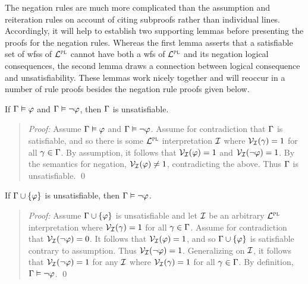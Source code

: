 The negation rules are much more complicated than the assumption and reiteration rules on account of citing subproofs rather than individual lines.
Accordingly, it will help to establish two supporting lemmas before presenting the proofs for the negation rules.
Whereas the first lemma asserts that a satisfiable set of wfss of $\mathcal{L}^{\textsc{pl}}$ cannot have both a wfs of $\mathcal{L}^{\textsc{pl}}$ and its negation logical consequences, the second lemma draws a connection between logical consequence and unsatisfiability.
These lemmas work nicely together and will reoccur in a number of rule proofs besides the negation rule proofs given below.
  
\begin{Lthm} \label{lemma:PL-unsat}
  If $\Gamma \vDash \varphi$ and $\Gamma \vDash \neg\varphi$, then $\Gamma$ is unsatisfiable.
\end{Lthm}
\vspace{-.2in}

\begin{quote} 
  \textit{Proof:} Assume $\Gamma \vDash \varphi$ and $\Gamma \vDash \neg\varphi$.
  Assume for contradiction that $\Gamma$ is satisfiable, and so there is some $\mathcal{L}^{\textsc{pl}}$ interpretation $\mathcal{I}$ where $\mathcal{V}_{\mathcal{I}}(\gamma) = 1$ for all $\gamma \in \Gamma$. 
  By assumption, it follows that $\mathcal{V}_{\mathcal{I}}(\varphi) = 1$ and $\mathcal{V}_{\mathcal{I}}(\neg \varphi) = 1$.
  By the semantics for negation, $\mathcal{V}_{\mathcal{I}}(\varphi) \neq 1$, contradicting the above.
  Thus $\Gamma$ is unsatisfiable. 
  \qed
\end{quote}




\begin{Lthm} \label{lemma:PL-unsatent}
  If $\Gamma \cup \lbrace\varphi\rbrace$ is unsatisfiable, then $\Gamma \vDash \neg\varphi$.
\end{Lthm}
\vspace{-.2in}

\begin{quote} 
  \textit{Proof:}
  Assume $\Gamma \cup \lbrace\varphi\rbrace$ is unsatisfiable and let $\mathcal{I}$ be an arbitrary $\mathcal{L}^{\textsc{pl}}$ interpretation where $\mathcal{V}_{\mathcal{I}}(\gamma) = 1$ for all $\gamma \in \Gamma$. 
  Assume for contradiction that $\mathcal{V}_{\mathcal{I}}(\neg \varphi) = 0$.
  It follows that $\mathcal{V}_{\mathcal{I}}(\varphi) = 1$, and so $\Gamma \cup \lbrace\varphi\rbrace$ is satisfiable contrary to assumption.
  Thus $\mathcal{V}_{\mathcal{I}}(\neg \varphi) = 1$.
  Generalizing on $\mathcal{I}$, it follows that $\mathcal{V}_{\mathcal{I}}(\neg \varphi) = 1$ for any $\mathcal{I}$ where $\mathcal{V}_{\mathcal{I}}(\gamma) = 1$ for all $\gamma \in \Gamma$.
  By definition, $\Gamma \vDash \neg\varphi$.
  \qed
\end{quote}

